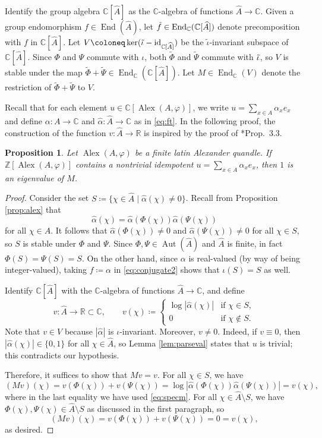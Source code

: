 \documentclass[12pt]{amsart}
\newtheorem{pro}[thm]{Proposition}
\theoremstyle{definition}
\theoremstyle{remark}
\newcommand{\Id}{\operatorname{id}}
\newcommand{\C}{\mathbb{C}}
\newcommand{\R}{\mathbb{R}}
\newcommand{\Z}{\mathbb{Z}}
\newcommand{\A}{\widehat{A}}
\newcommand{\Alpha}{\widehat{\alpha}}
\renewcommand{\phi}{\varphi}
\newcommand{\PHI}{\widetilde{\Phi}}
\newcommand{\PSI}{\widetilde{\Psi}}
\def\Aut{\operatorname{Aut}}
\def\End{\operatorname{End}}
\def\Alex{\operatorname{Alex}}
\begin{document}
Identify the group algebra $\C[\A]$ as the $\C$-algebra of functions $\A\to\C$. 
Given a group endomorphism $f\in\End(\A)$, let $\Tilde{f}\in\End_\C(\C[\A])$ denote precomposition with $f$ in $\C[\A]$. Let $V\coloneq\ker(\Tilde{\iota}-\Id_{\C[\A]})$ be the $\tilde\iota$-invariant subspace of $\C[\A]$. 
Since $\Phi$ and $\Psi$ commute with $\iota$, both $\PHI$ and $\PSI$ commute with $\Tilde{\iota}$, so $V$ is stable under the map $\PHI+\PSI\in\End_\C(\C[\A])$. Let $M\in\End_\C(V)$ denote the restriction of $\PHI+\PSI$ to $V$. 

Recall that for each element $u\in\C[\Alex(A,\phi)]$, we write $u=\sum_{x\in A}\alpha_xe_x$ and define $\alpha\colon A\to\C$ and $\Alpha\colon\A\to\C$ as in \eqref{eq:ft}. In the following proof, the construction of the function $v\colon\A\to\R$ is inspired by the proof of \cite{counterexample}*{Prop.\ 3.3}.

\begin{pro}\label{prop:specm}
    Let $\Alex(A,\phi)$ be a finite latin Alexander quandle. If $\Z[\Alex(A,\phi)]$ contains a nontrivial idempotent $u=\sum_{x\in A}\alpha_xe_x$, then $1$ is an eigenvalue of $M$.
\end{pro}

\begin{proof}
    Consider the set $S\coloneq\{\chi\in\A\mid\Alpha(\chi)\neq 0\}$. Recall from Proposition \ref{prop:alex} that
    \begin{equation}\label{eq:specm}
        \Alpha(\chi)=\Alpha(\Phi(\chi))\Alpha(\Psi(\chi))
    \end{equation}
    for all $\chi\in\A$. It follows that $\Alpha(\Phi(\chi))\neq 0$ and $\Alpha(\Psi(\chi))\neq 0$ for all $\chi\in S$, so $S$ is stable under $\Phi$ and $\Psi$. Since $\Phi,\Psi\in\Aut(\A)$ and $\A$ is finite, in fact $\Phi(S)=\Psi(S)=S$.
    On the other hand, since $\alpha$ is real-valued (by way of being integer-valued), taking $f\coloneq\alpha$ in \eqref{eq:conjugate2} shows that $\iota(S)=S$ as well. 

    Identify $\C[\A]$ with the $\C$-algebra of functions $\A\to\C$, and define
    \[
    v\colon \A\to\R\subset\C,\qquad v(\chi)\coloneq\begin{cases}
        \log|\Alpha(\chi)|&\text{if }\chi\in S,\\
        0&\text{if }\chi\notin S.
    \end{cases}
    \]
    Note that $v\in V$ because $|\Alpha|$ is $\iota$-invariant. Moreover, $v\neq 0$. Indeed, if $v\equiv 0$, then $|\Alpha(\chi)|\in\{0,1\}$ for all $\chi\in \A$, so Lemma \ref{lem:parseval} states that $u$ is trivial; this contradicts our hypothesis. 
    
    Therefore, it suffices to show that $Mv=v$. 
    For all $\chi\in S$, we have
    \[
    (Mv)(\chi)=v(\Phi(\chi))+v(\Psi(\chi))=\log|\Alpha(\Phi(\chi))\Alpha(\Psi(\chi))|=v(\chi),
    \]
    where in the last equality we have used \eqref{eq:specm}. For all $\chi\in\A\setminus S$, we have $\Phi(\chi),\Psi(\chi)\in\A\setminus  S$ as discussed in the first paragraph, so
    \[
    (Mv)(\chi)=v(\Phi(\chi))+v(\Psi(\chi))=0=v(\chi),
    \]
    as desired. 
\end{proof}
\end{document}
